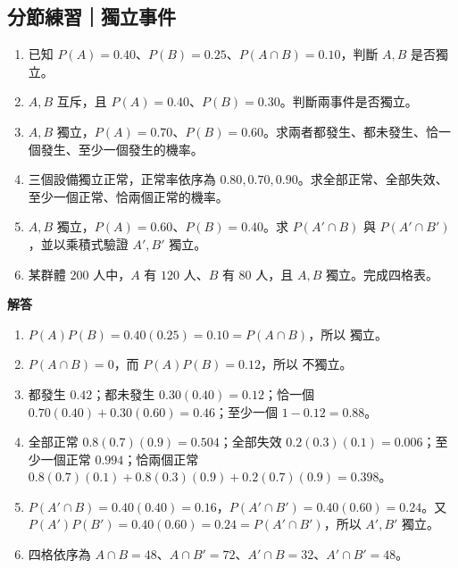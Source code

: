 \documentclass[11pt,a4paper]{article}
\providecommand{\tightlist}{%
  \setlength{\itemsep}{0pt}\setlength{\parskip}{0pt}}
\begin{document}
\begin{HandoutSelfCheck}

\subsection{分節練習｜獨立事件}\label{ux5206ux7bc0ux7df4ux7fd2ux7368ux7acbux4e8bux4ef6}

\begin{enumerate}
\def\labelenumi{\arabic{enumi}.}
\tightlist
\item
  已知 \(P(A)=0.40\)、\(P(B)=0.25\)、\(P(A\cap B)=0.10\)，判斷 \(A,B\) 是否獨立。
\item
  \(A,B\) 互斥，且 \(P(A)=0.40\)、\(P(B)=0.30\)。判斷兩事件是否獨立。
\item
  \(A,B\) 獨立，\(P(A)=0.70\)、\(P(B)=0.60\)。求兩者都發生、都未發生、恰一個發生、至少一個發生的機率。
\item
  三個設備獨立正常，正常率依序為 \(0.80,0.70,0.90\)。求全部正常、全部失效、至少一個正常、恰兩個正常的機率。
\item
  \(A,B\) 獨立，\(P(A)=0.60\)、\(P(B)=0.40\)。求 \(P(A'\cap B)\) 與 \(P(A'\cap B')\)，並以乘積式驗證 \(A',B'\) 獨立。
\item
  某群體 \(200\) 人中，\(A\) 有 \(120\) 人、\(B\) 有 \(80\) 人，且 \(A,B\) 獨立。完成四格表。
\end{enumerate}

\textbf{解答}

\begin{enumerate}
\def\labelenumi{\arabic{enumi}.}
\tightlist
\item
  \(P(A)P(B)=0.40(0.25)=0.10=P(A\cap B)\)，所以 \(\boxed{\text{獨立}}\)。
\item
  \(P(A\cap B)=0\)，而 \(P(A)P(B)=0.12\)，所以 \(\boxed{\text{不獨立}}\)。
\item
  都發生 \(\boxed{0.42}\)；都未發生 \(0.30(0.40)=\boxed{0.12}\)；恰一個 \(0.70(0.40)+0.30(0.60)=\boxed{0.46}\)；至少一個 \(1-0.12=\boxed{0.88}\)。
\item
  全部正常 \(0.8(0.7)(0.9)=\boxed{0.504}\)；全部失效 \(0.2(0.3)(0.1)=\boxed{0.006}\)；至少一個正常 \(\boxed{0.994}\)；恰兩個正常 \(0.8(0.7)(0.1)+0.8(0.3)(0.9)+0.2(0.7)(0.9)=\boxed{0.398}\)。
\item
  \(P(A'\cap B)=0.40(0.40)=\boxed{0.16}\)，\(P(A'\cap B')=0.40(0.60)=\boxed{0.24}\)。又 \(P(A')P(B')=0.40(0.60)=0.24=P(A'\cap B')\)，所以 \(A',B'\) 獨立。
\item
  四格依序為 \(A\cap B=48\)、\(A\cap B'=72\)、\(A'\cap B=32\)、\(A'\cap B'=48\)。
\end{enumerate}

\end{HandoutSelfCheck}
\end{document}
